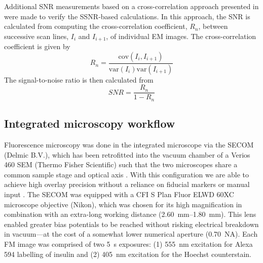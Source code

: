 Additional SNR measurements based on a cross-correlation approach presented in \textcite{joy2002smart} were made to verify the SSNR-based calculations. In this approach, the SNR is calculated from computing the cross-correlation coefficient, $R_n$, between successive scan lines, $I_i$ and $I_{i+1}$, of individual EM images. The cross-correlation coefficient is given by
%
\begin{equation}
    R_n = \frac{\text{cov} \left(I_i, I_{i+1}\right)}{\text{var} \left(I_i\right) \text{var} \left(I_{i+1}\right)}
\end{equation}
%
The signal-to-noise ratio is then calculated from
%
\begin{equation}
    SNR = \frac{R_n}{1-R_n}
\end{equation}
%


\subsection{Integrated microscopy workflow}
\label{sec:2.4.4_workflow}

Fluorescence microscopy was done in the integrated microscope via the SECOM (Delmic B.V.), which has been retrofitted into the vacuum chamber of a Verios 460 SEM (Thermo Fisher Scientific) such that the two microscopes share a common sample stage and optical axis \cite{liv2013simultaneous, zonnevylle2013integration}. With this configuration we are able to achieve high overlay precision without a reliance on fiducial markers or manual input \cite{haring2017automated}. The SECOM was equipped with a CFI S Plan Fluor ELWD 60XC microscope objective (Nikon), which was chosen for its high magnification in combination with an extra-long working distance (\SIrange{2.60}{1.80}{\milli\meter}). This lens enabled greater bias potentials to be reached without risking electrical breakdown in vacuum—at the cost of a somewhat lower numerical aperture (\SI{0.70}{NA}). Each FM image was comprised of two \SI{5}{\second} exposures: (1) \SI{555}{\nano\meter} excitation for Alexa 594 labelling of insulin and (2) \SI{405}{\nano\meter} excitation for the Hoechst counterstain.

